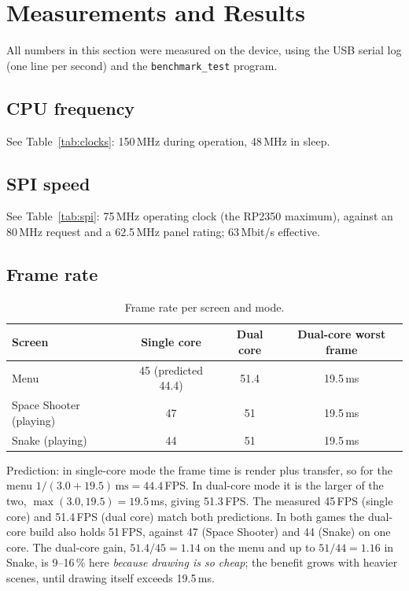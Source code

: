 \documentclass[11pt,a4paper]{article}
\begin{document}
\section{Measurements and Results}\label{sec:measure}

All numbers in this section were measured on the device, using the USB serial
log (one line per second) and the \texttt{benchmark\_test} program.

\subsection{CPU frequency}
See Table~\ref{tab:clocks}: 150\,MHz during operation, 48\,MHz in sleep.

\subsection{SPI speed}
See Table~\ref{tab:spi}: 75\,MHz operating clock (the RP2350 maximum), against an
80\,MHz request and a 62.5\,MHz panel rating; 63\,Mbit/s effective.

\subsection{Frame rate}\label{sec:fps}
\begin{table}[H]
\centering
\caption{Frame rate per screen and mode.}\label{tab:fps}
\begin{tabular}{lccc}
\toprule
\textbf{Screen} & \textbf{Single core} & \textbf{Dual core} & \textbf{Dual-core worst frame} \\
\midrule
Menu & 45 (predicted 44.4) & 51.4 & 19.5\,ms \\
Space Shooter (playing) & 47 & 51 & 19.5\,ms \\
Snake (playing) & 44 & 51 & 19.5\,ms \\
\bottomrule
\end{tabular}
\end{table}

\noindent Prediction: in single-core mode the frame time is render plus transfer,
so for the menu $1/(3.0+19.5)\,\text{ms} = 44.4$\,FPS. In dual-core mode it is
the larger of the two, $\max(3.0, 19.5) = 19.5$\,ms, giving 51.3\,FPS. The
measured 45\,FPS (single core) and 51.4\,FPS (dual core) match both predictions.
In both games the dual-core build also holds 51\,FPS, against 47 (Space Shooter)
and 44 (Snake) on one core. The dual-core gain, $51.4/45 = 1.14$ on the menu and
up to $51/44 = 1.16$ in Snake, is 9--16\,\% here
\emph{because drawing is so cheap}; the benefit grows with heavier scenes, until
drawing itself exceeds 19.5\,ms.
\end{document}
